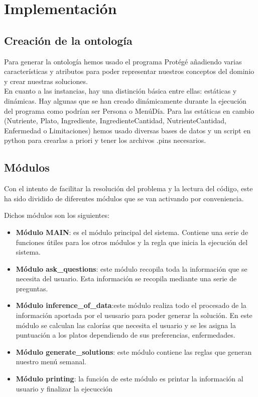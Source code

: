 \documentclass[11]{article}
\begin{document}
\section{Implementación}

\subsection{Creación de la ontología}
Para generar la ontología hemos usado el programa Protégé añadiendo varias características y atributos para poder representar nuestros conceptos del dominio y crear nuestras soluciones.
\\
En cuanto a las instancias, hay una distinción básica entre ellas: estáticas y dinámicas. Hay algunas que se han creado dinámicamente durante la ejecución del programa como podrían ser Persona o MenúDía. Para las estáticas en cambio (Nutriente, Plato, Ingrediente, IngredienteCantidad, NutrienteCantidad, Enfermedad o Limitaciones) hemos usado diversas bases de datos y un script en python para crearlas a priori y tener los archivos .pins necesarios. 
\subsection{Módulos}
Con el intento de facilitar la resolución del problema y la lectura del código, este ha sido dividido de diferentes módulos que se van activando por conveniencia.
\par
Dichos módulos son los siguientes:
\begin{itemize}
	\item \textbf{Módulo MAIN}: es el módulo principal del sistema. Contiene una serie de funciones útiles para los otros módulos y la regla que inicia la ejecución del sistema. 
	\item \textbf{Módulo ask\_questions}: este módulo recopila toda la información que se necesita del usuario. Esta información se recopila mediante una serie de preguntas. 
	\item \textbf{Módulo inference\_of\_data}:este módulo realiza todo el procesado de la información aportada por el ususario para poder generar la solución. En este módulo se calculan las calorías que necesita el usuario y se les asigna la puntuación a los platos dependiendo de sus preferencias, enfermedades.  
	\item \textbf{Módulo generate\_solutions}: este módulo contiene las reglas que generan nuestro menú semanal.
	\item \textbf{Módulo printing}: la función de este módulo es printar la información al usuario y finalizar la ejecucción
\end{itemize}
\end{document}
